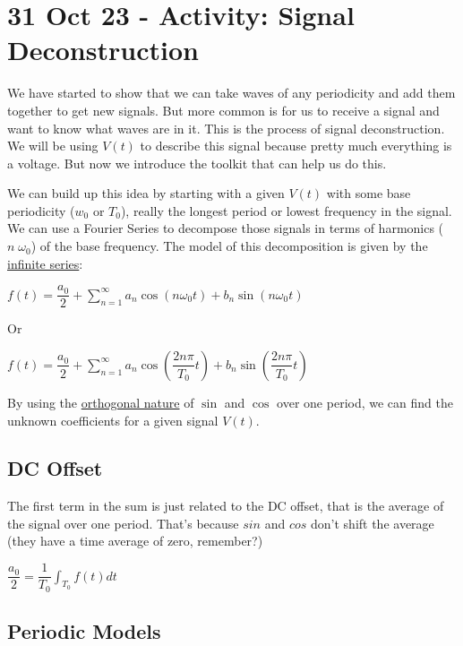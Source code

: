 \section{31 Oct 23 - Activity: Signal
Deconstruction}\label{oct-23---activity-signal-deconstruction}

We have started to show that we can take waves of any periodicity and
add them together to get new signals. But more common is for us to
receive a signal and want to know what waves are in it. This is the
process of signal deconstruction. We will be using \(V(t)\) to describe
this signal because pretty much everything is a voltage. But now we
introduce the toolkit that can help us do this.

We can build up this idea by starting with a given \(V(t)\) with some
base periodicity (\(w_0\) or \(T_0\)), really the longest period or
lowest frequency in the signal. We can use a Fourier Series to decompose
those signals in terms of harmonics (\(n\;\omega_0\)) of the base
frequency. The model of this decomposition is given by the
\href{https://en.wikipedia.org/wiki/Fourier_series\#Sine-cosine_form}{infinite
series}:

\(f(t) = \dfrac{a_0}{2} + \sum_{n=1}^{\infty} a_n \cos(n\omega_0t) + b_n \sin(n\omega_0t)\)

Or

\(f(t) = \dfrac{a_0}{2} + \sum_{n=1}^{\infty} a_n \cos\left(\dfrac{2n\pi}{T_0}t\right) + b_n \sin\left(\dfrac{2n\pi}{T_0}t\right)\)

By using the
\href{https://en.wikipedia.org/wiki/Orthogonal_functions}{orthogonal
nature} of \(\sin\) and \(\cos\) over one period, we can find the
unknown coefficients for a given signal \(V(t)\).

\subsection{DC Offset}\label{dc-offset}

The first term in the sum is just related to the DC offset, that is the
average of the signal over one period. That's because \(sin\) and
\(cos\) don't shift the average (they have a time average of zero,
remember?)

\(\dfrac{a_0}{2} = \dfrac{1}{T_0}\int_{T_0} f(t) dt\)

\subsection{Periodic Models}\label{periodic-models}

